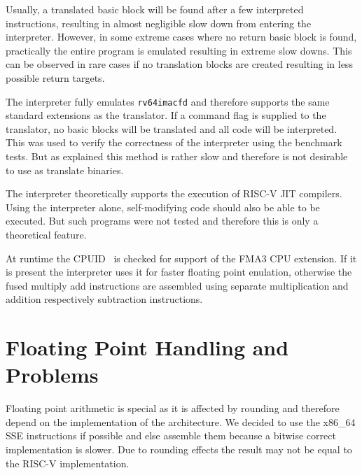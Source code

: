 \documentclass[course=eragp]{aspdoc}
\begin{document}
\par

Usually, a translated basic block will be found after a few interpreted instructions, resulting in almost
negligible slow down from entering the interpreter. However, in some extreme cases where no return
basic block is found, practically the entire program is emulated resulting in extreme slow downs.
This can be observed in rare cases if no translation blocks are created resulting in less possible
return targets.

\par

The interpreter fully emulates \texttt{rv64imacfd} and therefore supports the same standard
extensions as the translator. If a command flag is supplied to the translator, no
basic blocks will be translated and all code will be interpreted. This was used to verify the
correctness of the interpreter using the benchmark tests. But as explained this method is rather
slow and therefore is not desirable to use as translate binaries.

\par

The interpreter theoretically supports the execution of RISC-V JIT compilers. Using the interpreter
alone, self-modifying code should also be able to be executed. But such programs were not tested and
therefore this is only a theoretical feature.

\par

At runtime the CPUID~\cite{intel2017man} is checked for support of the FMA3 CPU extension. If it is
present the interpreter uses it for faster floating point enulation, otherwise the fused multiply
add instructions are assembled using separate multiplication and addition respectively subtraction
instructions.

\par

\section{Floating Point Handling and Problems}\label{sec:floating_point}

Floating point arithmetic is special as it is affected by rounding and therefore depend on the
implementation of the architecture. We decided to use the x86\_64 SSE instructions if possible and
else assemble them because a bitwise correct implementation is slower. Due to rounding effects the
result may not be equal to the RISC-V implementation.
\end{document}
